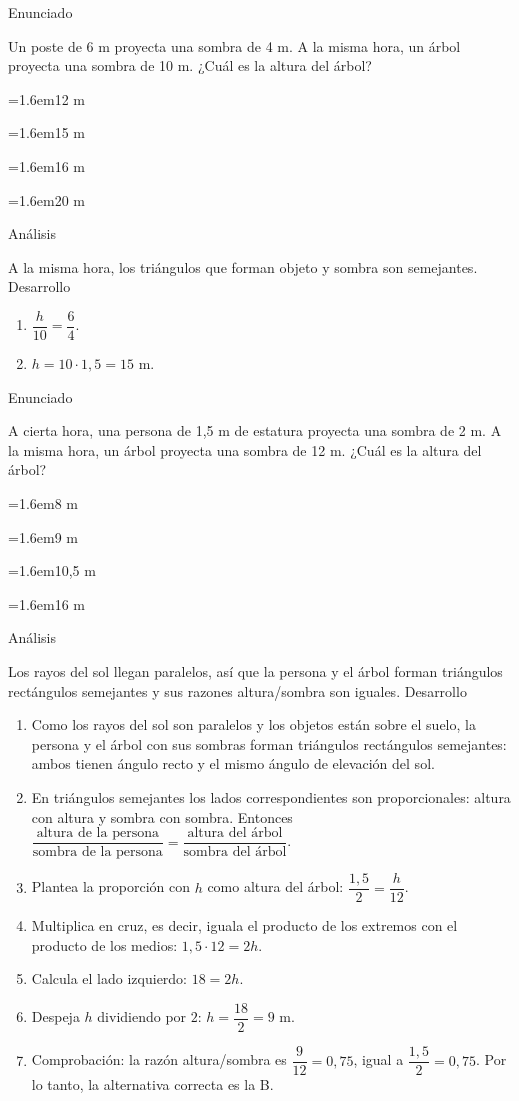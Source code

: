 \documentclass[10pt,a4paper,twocolumn]{article}
\newcommand{\alternativa}[2]{\par\noindent\hangindent=1.6em\hangafter=1\makebox[1.6em][l]{\tecla{#1}}#2\par}
\newcommand{\clave}[1]{\par\smallskip{\sffamily\footnotesize\color{esmeralda} Clave \teclaok{#1}}\par}
\begin{document}
\begin{ejemplo}
{\sffamily\footnotesize\color{zinc500} Enunciado}\par
Un poste de 6 m proyecta una sombra de 4 m. A la misma hora, un árbol proyecta una sombra de 10 m. ¿Cuál es la altura del árbol?
\alternativa{A}{12 m}
\alternativa{B}{15 m}
\alternativa{C}{16 m}
\alternativa{D}{20 m}
\clave{B}
{\sffamily\footnotesize\color{zinc500} Análisis}\par A la misma hora, los triángulos que forman objeto y sombra son semejantes.
{\sffamily\footnotesize\color{zinc500} Desarrollo}
\begin{enumerate}
  \item $\dfrac{h}{10}=\dfrac{6}{4}$.
  \item $h=10\cdot 1{,}5=15$ m.
\end{enumerate}
\end{ejemplo}

\begin{ejemplo}
{\sffamily\footnotesize\color{zinc500} Enunciado}\par
A cierta hora, una persona de 1,5 m de estatura proyecta una sombra de 2 m. A la misma hora, un árbol proyecta una sombra de 12 m. ¿Cuál es la altura del árbol?
\alternativa{A}{8 m}
\alternativa{B}{9 m}
\alternativa{C}{10,5 m}
\alternativa{D}{16 m}
\clave{B}
{\sffamily\footnotesize\color{zinc500} Análisis}\par Los rayos del sol llegan paralelos, así que la persona y el árbol forman triángulos rectángulos semejantes y sus razones altura/sombra son iguales.
{\sffamily\footnotesize\color{zinc500} Desarrollo}
\begin{enumerate}
  \item Como los rayos del sol son paralelos y los objetos están sobre el suelo, la persona y el árbol con sus sombras forman triángulos rectángulos semejantes: ambos tienen ángulo recto y el mismo ángulo de elevación del sol.
  \item En triángulos semejantes los lados correspondientes son proporcionales: altura con altura y sombra con sombra. Entonces $\dfrac{\text{altura de la persona}}{\text{sombra de la persona}} = \dfrac{\text{altura del árbol}}{\text{sombra del árbol}}$.
  \item Plantea la proporción con $h$ como altura del árbol: $\dfrac{1{,}5}{2} = \dfrac{h}{12}$.
  \item Multiplica en cruz, es decir, iguala el producto de los extremos con el producto de los medios: $1{,}5\cdot 12 = 2h$.
  \item Calcula el lado izquierdo: $18 = 2h$.
  \item Despeja $h$ dividiendo por $2$: $h = \dfrac{18}{2} = 9$ m.
  \item Comprobación: la razón altura/sombra es $\dfrac{9}{12} = 0{,}75$, igual a $\dfrac{1{,}5}{2} = 0{,}75$. Por lo tanto, la alternativa correcta es la B.
\end{enumerate}
\end{ejemplo}
\end{document}
